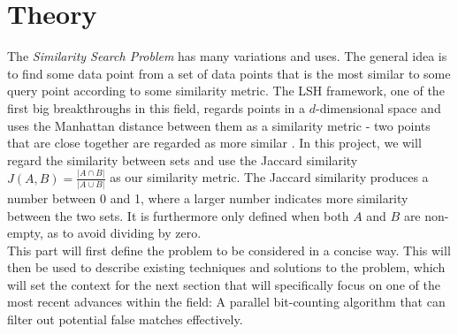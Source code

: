 \section{Theory}
The \textit{Similarity Search Problem} has many variations and uses. The general idea is to find some data point from a set of data points that is the most similar to some query point according to some similarity metric. The LSH framework, one of the first big breakthroughs in this field, regards points in a $d$-dimensional space and uses the Manhattan distance between them as a similarity metric - two points that are close together are regarded as more similar \cite{classic-lsh}. In this project, we will regard the similarity between sets and use the Jaccard similarity $J(A,B)=\frac{|A\cap B|}{|A\cup B|}$ as our similarity metric. The Jaccard similarity produces a number between 0 and 1, where a larger number indicates more similarity between the two sets. It is furthermore only defined when both $A$ and $B$ are non-empty, as to avoid dividing by zero.\\
This part will first define the problem to be considered in a concise way. This will then be used to describe existing techniques and solutions to the problem, which will set the context for the next section that will specifically focus on one of the most recent advances within the field: A parallel bit-counting algorithm that can filter out potential false matches effectively.





